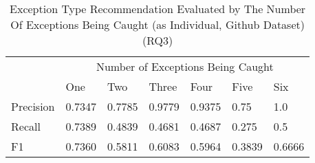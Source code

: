 \begin{table}[t]%
  \caption{Exception Type Recommendation Evaluated by The Number Of Exceptions Being Caught (\xtype as Individual, Github Dataset) (RQ3)}
  \vspace{-12pt}
  \small
	\begin{center}
		\renewcommand{\arraystretch}{1}
		\begin{tabular}{| p{1.2cm}<{\centering} | p{0.8cm}<{\centering} | p{0.8cm}<{\centering}| p{0.8cm}<{\centering} | p{0.8cm}<{\centering} | p{0.8cm}<{\centering} | p{0.8cm}<{\centering} |}
		  \hline
			\multirow{2}{*}{} & \multicolumn{6}{c|}{Number of Exceptions Being Caught} \\
			\cline{2-7}
			  & One & Two & Three & Four & Five & Six\\
			\hline
			Precision &  0.7347 & 0.7785 & 0.9779 & 0.9375 & 0.75 & 1.0\\
			\hline
			Recall &  0.7389 & 0.4839 & 0.4681 & 0.4687 & 0.275 & 0.5\\
			\hline
			F1 &  0.7360 & 0.5811 & 0.6083 & 0.5964 & 0.3839 & 0.6666\\
			\hline
		\end{tabular}
		\label{tab:r3-xtype-1}
	\end{center}
\end{table}